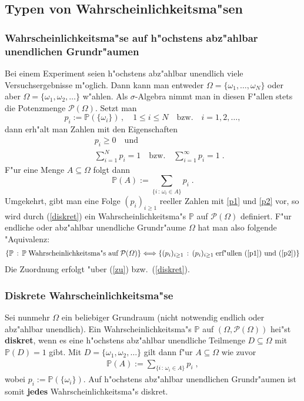 \documentclass[ngerman,draft,parskip=half,twoside]{scrartcl}
\newcommand*{\PotM}{\mathcal{P}}    %
\newcommand*{\WKM}{\mathbb{P}}      %
\begin{document}
\subsection{Typen von Wahrscheinlichkeitsma"sen}
\subsubsection{Wahrscheinlichkeitsma"se auf h"ochstens abz"ahlbar unendlichen Grundr"aumen}
Bei einem Experiment seien h"ochstens abz"ahlbar unendlich viele Versuchsergebnisse
m"oglich. Dann kann man entweder $\Omega=\{\omega_1,\ldots,\omega_N\}$ oder
aber $\Omega=\{\omega_1,\omega_2,\ldots\}$ w"ahlen. Als $\sigma$-Algebra nimmt man in diesen
F"allen stets die Potenzmenge $\PotM(\Omega)$. Setzt man
\begin{equation}
\label{zu}
p_i :=\WKM(\{\omega_i\})\,,\quad 1\le i\le N\quad\mbox{bzw.}\quad i=1,2,\ldots,
\end{equation}
dann erh"alt man Zahlen mit den Eigenschaften
\begin{eqnarray}
\label{p1}
&&p_i\ge 0\quad \mbox{und}\\
\label{p2}
&&\sum_{i=1}^N p_i =1\quad \mbox{bzw.}\quad \sum_{i=1}^\infty p_i =1\;.
\end{eqnarray}
F"ur eine Menge $A\subseteq \Omega$ folgt dann
\begin{equation}
\label{diskret}
\WKM(A):= \sum_{\{i\, : \,\omega_i\in A\}} p_i\;.
\end{equation}
Umgekehrt, gibt man eine Folge $(p_i)_{i\ge 1}$ reeller Zahlen mit \eqref{p1} und \eqref{p2} vor,
so wird durch (\ref{diskret}) ein Wahrscheinlichkeitsma"s $\WKM$ auf $\PotM(\Omega)$ definiert. F"ur
endliche oder abz"ahlbar unendliche Grundr"aume $\Omega$ hat man also folgende "Aquivalenz:
\begin{gather*}
  \{\WKM\,:\,\WKM\;\mbox{Wahrscheinlichkeitsma"s auf}\;\PotM(\Omega)\}
     \Longleftrightarrow\{(p_i)_{i\ge 1}\,:\, (p_i)_{i\ge 1}\;\mbox{erf"ullen (\ref{p1}) und (\ref{p2})}\}
\end{gather*}
Die Zuordnung erfolgt "uber (\ref{zu}) bzw.~(\ref{diskret}).

\subsubsection{Diskrete Wahrscheinlichkeitsma"se}
Sei nunmehr $\Omega$ ein beliebiger Grundraum (nicht notwendig endlich
oder abz"ahlbar unendlich). Ein Wahrscheinlichkeitsma"s $\WKM$ auf $(\Omega,\PotM(\Omega))$
hei"st \textbf{diskret}, wenn es eine h"ochstens abz"ahlbar unendliche Teilmenge $D\subseteq \Omega$
mit $\WKM(D)=1$ gibt. Mit $D=\{\omega_1,\omega_2,\ldots\}$ gilt dann f"ur $A\subseteq \Omega$ wie zuvor
\begin{gather*}
  \WKM(A):= \sum_{\{i\, : \,\omega_i\in A\}} p_i\;,
\end{gather*}
wobei $p_i:=\WKM(\{\omega_i\})$. Auf h"ochstens abz"ahlbar unendlichen Grundr"aumen ist somit \textbf{jedes}
Wahrscheinlichkeitsma"s diskret.
\end{document}
